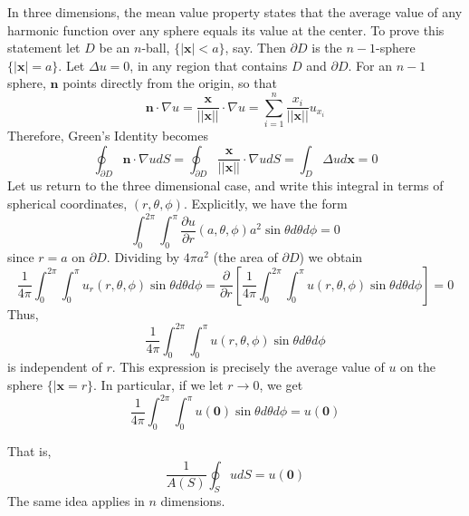 In three dimensions, the mean value property states that the average value of any harmonic function over any sphere equals its value at the center. To prove this statement let $D$ be an $n$-ball, $\{|\mathbf{x}| < a\}$, say. Then $\partial D$ is the $n-1$-sphere $\{|\mathbf{x}| = a\}$. Let $\Delta u = 0$, in any region that contains $D$ and $\partial D$. For an $n-1$ sphere, $\mathbf{n}$ points directly from the origin, so that \begin{equation*}
    \mathbf{n}\cdot \nabla u = \frac{\mathbf{x}}{||\mathbf{x}||}\cdot \nabla u = \sum_{i=1}^n\frac{x_i}{||\mathbf{x}||}u_{x_i} 
\end{equation*}
Therefore, Green's Identity becomes \begin{equation*}
    \oint_{\partial D}\mathbf{n}\cdot\nabla udS = \oint_{\partial D}\frac{\mathbf{x}}{||\mathbf{x}||}\cdot \nabla udS = \int_{D}\Delta ud\mathbf{x} = 0
\end{equation*}
Let us return to the three dimensional case, and write this integral in terms of spherical coordinates, $(r,\theta,\phi)$. Explicitly, we have the form \begin{equation*}
    \int_0^{2\pi}\int_0^{\pi}\frac{\partial u}{\partial r}(a,\theta,\phi)a^2\sin\theta d\theta d\phi = 0
\end{equation*}
since $r = a$ on $\partial D$. Dividing by $4\pi a^2$ (the area of $\partial D$) we obtain \begin{equation*}
    \frac{1}{4\pi}\int_0^{2\pi}\int_0^{\pi}u_r(r,\theta,\phi)\sin\theta d\theta d\phi = \frac{\partial}{\partial r}\left[\frac{1}{4\pi}\int_0^{2\pi}\int_0^{\pi}u(r,\theta,\phi)\sin\theta d\theta d\phi\right] = 0
\end{equation*}
Thus, \begin{equation*}
    \frac{1}{4\pi}\int_0^{2\pi}\int_0^{\pi}u(r,\theta,\phi)\sin\theta d\theta d\phi
\end{equation*}
is independent of $r$. This expression is precisely the average value of $u$ on the sphere $\{|\mathbf{x}=r\}$. In particular, if we let $r\rightarrow 0$, we get \begin{equation*}
    \frac{1}{4\pi}\int_0^{2\pi}\int_0^{\pi}u(\mathbf{0})\sin\theta d\theta d\phi = u(\mathbf{0})
\end{equation*}

That is, \begin{equation}
    \boxed{\frac{1}{A(S)}\oint_SudS = u(\mathbf{0})}
\end{equation}
The same idea applies in $n$ dimensions.



